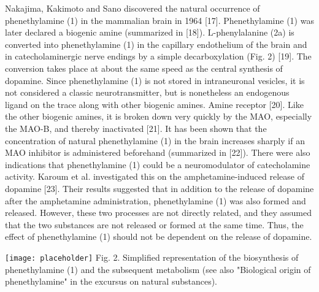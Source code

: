 Nakajima, Kakimoto and Sano discovered the natural occurrence of phenethylamine (1) in the mammalian brain in 1964 [17]. Phenethylamine (1) was later declared a biogenic amine (summarized in [18]). L-phenylalanine (2a) is converted into phenethylamine (1) in the capillary endothelium of the brain and in catecholaminergic nerve endings by a simple decarboxylation (Fig. 2) [19]. The conversion takes place at about the same speed as the central synthesis of dopamine. Since phenethylamine (1) is not stored in intraneuronal vesicles, it is not considered a classic neurotransmitter, but is nonetheless an endogenous ligand on the trace along with other biogenic amines.
Amine receptor [20]. Like the other biogenic amines, it is broken down very quickly by the MAO, especially the MAO-B, and thereby inactivated [21].
It has been shown that the concentration of natural phenethylamine (1) in the brain increases sharply if an MAO inhibitor is administered beforehand (summarized in [22]).
There were also indications that phenethylamine (1) could be a neuromodulator of catecholamine activity. Karoum et al. investigated this on the amphetamine-induced release of dopamine [23]. Their results suggested that in addition to the release of dopamine after the amphetamine administration, phenethylamine (1) was also formed and released. However, these two processes are not directly related, and they assumed that the two substances are not released or formed at the same time. Thus, the effect of phenethylamine (1) should not be dependent on the release of dopamine.
\clearpage

\texttt{[image: placeholder]}
Fig. 2. Simplified representation of the biosynthesis of phenethylamine (1) and the subsequent metabolism (see also "Biological origin of phenethylamine" in the excursus on natural substances).


